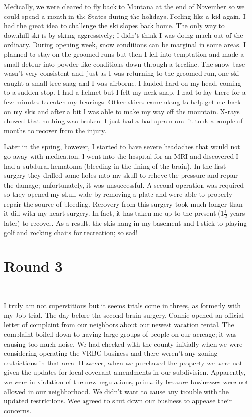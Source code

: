 \documentclass[twoside, 12pt]{book}
\begin{document}
Medically, we were cleared to fly back to Montana at the end of November so we could spend a month in the States during the holidays. Feeling like a kid again, I had the great idea to challenge the ski slopes back home. The only way to downhill ski is by skiing aggressively; I didn’t think I was doing much out of the ordinary. During opening week, snow conditions can be marginal in some areas. I planned to stay on the groomed runs but then I fell into temptation and made a small detour into powder-like conditions down through a treeline. The snow base wasn’t very consistent and, just as I was returning to the groomed run, one ski caught a small tree snag and I was airborne. I landed hard on my head, coming to a sudden stop. I had a helmet but I felt my neck snap. I had to lay there for a few minutes to catch my bearings. Other skiers came along to help get me back on my skis and after a bit I was able to make my way off the mountain. X-rays showed that nothing was broken; I just had a bad sprain and it took a couple of months to recover from the injury. 

Later in the spring, however, I started to have severe headaches that would not go away with medication. I went into the hospital for an MRI and discovered I had a subdural hematoma (bleeding in the lining of the brain). In the first surgery they drilled some holes into my skull to relieve the pressure and repair the damage; unfortunately, it was unsuccessful. A second operation was required so they opened my skull wide by removing a plate and were able to properly repair the source of bleeding. Recovery from this surgery took much longer than it did with my heart surgery. In fact, it has taken me up to the present (1$\frac{1}{2}$ years later) to recover. As a result, the skis hang in my basement and I stick to playing golf and rocking chairs for recreation; so sad!


\section{Round 3}
\

I truly am not superstitious but it seems trials come in threes, as formerly with my Job trial. The day before the second brain surgery, Connie opened an official letter of complaint from our neighbors about our newest vacation rental. The complaint boiled down to having large groups of people on our acreage; it was causing too much noise. We had checked with the county initially when we were considering operating the VRBO business and there weren’t any zoning restrictions in that area. However, when we purchased the property we were not given the updates for local covenant amendments in our subdivision. Apparently, we were in violation of the new regulations, primarily because businesses were not allowed in our neighborhood. We didn’t want to cause any trouble with the updated restrictions. Wee agreed to shut down our business to appease their concerns. 
\end{document}
